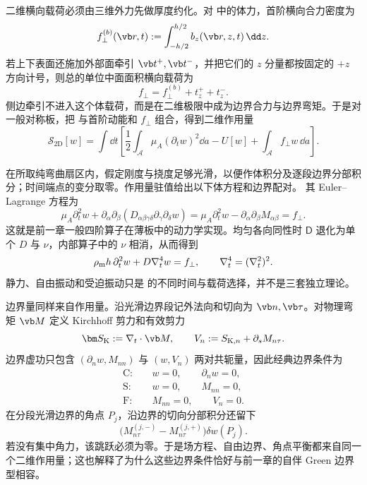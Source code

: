 二维横向载荷必须由三维外力先做厚度约化。对 中的体力，首阶横向合力密度为
\[
 f_{\perp}^{(b)}(\vb r,t):=\int_{-h/2}^{h/2}b_z(\vb r,z,t)\,\dd z.
\]
若上下表面还施加外部面牵引 \(\vb t^{+},\vb t^{-}\)，并把它们的 \(z\) 分量都按固定的 \(+z\) 方向计号，则总的单位中面面积横向载荷为
\begin{equation}
 f_\perp=f_{\perp}^{(b)}+t_z^{+}+t_z^{-}.
 \label{eq:phys-cont-transverse-load-reduction}
\end{equation}
侧边牵引不进入这个体载荷，而是在二维极限中成为边界合力与边界弯矩。于是对一般对称板，把 与首阶动能和 \(f_\perp\) 组合，得到二维作用量
\begin{equation}
 \mathcal S_{2\mathrm D}[w]
 =\int\dd t\left[
 \frac12\int_{\mathcal A}\mu_A(\partial_tw)^2\dd a
 -U[w]+\int_{\mathcal A}f_\perp w\,\dd a
 \right].
 \label{eq:phys-cont-general-plate-action}
\end{equation}
\begin{proposition}[薄板作用量的体方程与自然边界]
在所取纯弯曲扇区内，假定刚度与挠度足够光滑，以便作体积分及逐段边界分部积分；时间端点的变分取零。作用量驻值给出以下体方程和边界配对。
其 Euler--Lagrange 方程为
\begin{equation}
 \mu_A\partial_t^2w
 +\partial_\alpha\partial_\beta
 \left(D_{\alpha\beta\gamma\delta}\partial_\gamma\partial_\delta w\right)
 =\mu_A\partial_t^2w-\partial_\alpha\partial_\beta M_{\alpha\beta}
 =f_\perp.
 \label{eq:phys-cont-general-plate-eom}
\end{equation}
这就是前一章一般四阶算子在薄板中的动力学实现。均匀各向同性时 \(\mathsf D\) 退化为单个 \(D\) 与 \(\nu\)，内部算子中的 \(\nu\) 相消，从而得到
\begin{equation}
 \rho_{\rm m} h\,\partial_t^2w+D\nabla_t^4w=f_\perp,\qquad
 \nabla_t^4=(\nabla_t^2)^2.
 \label{eq:phys-cont-kl-eom}
\end{equation}
静力、自由振动和受迫振动只是 的不同时间与载荷选择，并不是三套独立理论。

边界量同样来自作用量。沿光滑边界段记外法向和切向为 \(\vb n,\vb\tau\)。对物理弯矩 \(\vb M\) 定义 Kirchhoff 剪力和有效剪力
\begin{equation}
 \bm S_{\rm K}:=\nabla_t\cdot\vb M,
 \qquad
 V_n:=S_{{\rm K},n}+\partial_sM_{n\tau}.
 \label{eq:phys-cont-kl-effective-shear}
\end{equation}
边界虚功只包含 \((\partial_nw,M_{nn})\) 与 \((w,V_n)\) 两对共轭量，因此经典边界条件为
\begin{align*}
 \mathrm C:&\quad w=0,\qquad \partial_nw=0,\\
 \mathrm S:&\quad w=0,\qquad M_{nn}=0,\\
 \mathrm F:&\quad M_{nn}=0,\qquad V_n=0.
\end{align*}
在分段光滑边界的角点 \(P_j\)，沿边界的切向分部积分还留下
\[
 \bigl(M_{n\tau}^{(j,-)}-M_{n\tau}^{(j,+)}\bigr)\delta w(P_j).
\]
若没有集中角力，该跳跃必须为零。于是场方程、自由边界、角点平衡都来自同一个二维作用量；这也解释了为什么这些边界条件恰好与前一章的自伴 Green 边界型相容。

\end{proposition}

